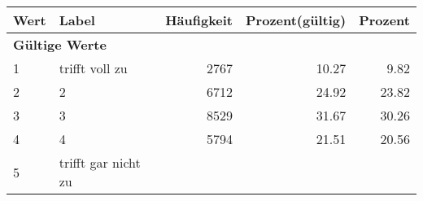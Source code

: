      \begin{longtable}{lXrrr}
     \toprule
     \textbf{Wert} & \textbf{Label} & \textbf{Häufigkeit} & \textbf{Prozent(gültig)} & \textbf{Prozent} \\
     \endhead
     \midrule
     \multicolumn{5}{l}{\textbf{Gültige Werte}}\\

     1 &
     \multicolumn{1}{X}{ trifft voll zu   } &


       \num{2767} &
       \num[round-mode=places,round-precision=2]{10.27} &
         \num[round-mode=places,round-precision=2]{9.82} \\

     2 &
     \multicolumn{1}{X}{ 2   } &


       \num{6712} &
       \num[round-mode=places,round-precision=2]{24.92} &
         \num[round-mode=places,round-precision=2]{23.82} \\

     3 &
     \multicolumn{1}{X}{ 3   } &


       \num{8529} &
       \num[round-mode=places,round-precision=2]{31.67} &
         \num[round-mode=places,round-precision=2]{30.26} \\

     4 &
     \multicolumn{1}{X}{ 4   } &


       \num{5794} &
       \num[round-mode=places,round-precision=2]{21.51} &
         \num[round-mode=places,round-precision=2]{20.56} \\

     5 &
     \multicolumn{1}{X}{ trifft gar nicht zu   } &



\end{longtable}
